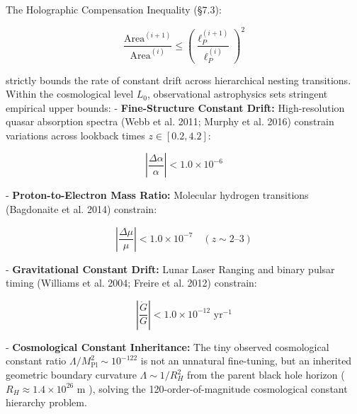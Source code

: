 \documentclass[11pt,a4paper]{article}
\theoremstyle{definition}
\theoremstyle{remark}
\begin{document}
The Holographic Compensation Inequality (\S 7.3):


\begin{equation}
\frac{\mathrm{Area}^{(i+1)}}{\mathrm{Area}^{(i)}} \le \left( \frac{\ell_P^{(i+1)}}{\ell_P^{(i)}} \right)^2
\end{equation}


strictly bounds the rate of constant drift across hierarchical nesting transitions. Within the cosmological level $L_0$, observational astrophysics sets stringent empirical upper bounds:
- \textbf{Fine-Structure Constant Drift:} High-resolution quasar absorption spectra (Webb et al. 2011; Murphy et al. 2016) constrain variations across lookback times $z \in [0.2, 4.2]$:


\begin{equation}
\left|\frac{\Delta\alpha}{\alpha}\right| < 1.0 \times 10^{-6}
\end{equation}


- \textbf{Proton-to-Electron Mass Ratio:} Molecular hydrogen transitions (Bagdonaite et al. 2014) constrain:


\begin{equation}
\left|\frac{\Delta\mu}{\mu}\right| < 1.0 \times 10^{-7} \quad (z \sim 2\text{--}3)
\end{equation}


- \textbf{Gravitational Constant Drift:} Lunar Laser Ranging and binary pulsar timing (Williams et al. 2004; Freire et al. 2012) constrain:


\begin{equation}
\left|\frac{\dot{G}}{G}\right| < 1.0 \times 10^{-12}\text{ yr}^{-1}
\end{equation}


- \textbf{Cosmological Constant Inheritance:} The tiny observed cosmological constant ratio $\Lambda / M_{\text{Pl}}^2 \sim 10^{-122}$ is not an unnatural fine-tuning, but an inherited geometric boundary curvature $\Lambda \sim 1/R_H^2$ from the parent black hole horizon ( $R_H \approx 1.4 \times 10^{26}\text{ m}$ ), solving the 120-order-of-magnitude cosmological constant hierarchy problem.
\end{document}
